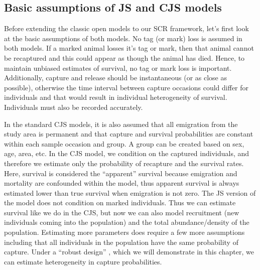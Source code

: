 \subsection{Basic assumptions of JS and CJS models}

Before extending the classic open models to our SCR framework, let's first look
at the basic assumptions of both models.  No tag (or mark) loss is
assumed in both models.  If a marked animal losses it's tag or
mark, then that animal cannot be recaptured and this could appear as
though the animal has died.  Hence, to maintain unbiased estimates of
survival, no tag or mark loss is important.  Additionally, capture and
release should be instantaneous (or as close as possible), otherwise
the time interval between capture occasions could differ for
individuals and that would result in individual heterogeneity of
survival.  Individuals must also be recorded accurately.

In the standard CJS models, it is also assumed that all emigration
from the study area is permanent and that capture and survival
probabilities are constant within each sample occasion and group.  A
group can be created based on sex, age, area, etc.  In the CJS
model, we condition on the captured individuals,
and therefore we estimate only the probability of recapture and the survival
rates.  Here, survival is considered the ``apparent'' survival
because
emigration and mortality are confounded within the model, thus
apparent survival is always estimated lower than true survival when
emigration is not zero.  The JS version of the model does not
condition on marked individuals.  Thus we can estimate survival like
we do in the CJS, but now we can also model recruitment (new
individuals coming into the population) and the total
abundance/density of the population.  Estimating more parameters does
require a few more assumptions including that all individuals in the
population have the same probability of capture.  Under a ``robust
design'' \citep{pollock:1982}, which we will demonstrate in this
chapter, we can estimate heterogeneity in capture probabilities.



